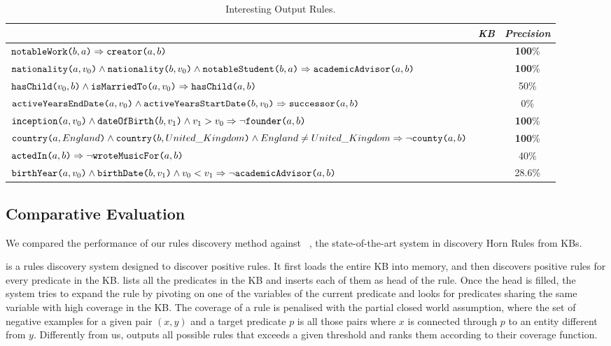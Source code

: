 \begin{table}[htb]
	\centering
	\label{tab:krd_rules_example}
	\begin{small}
		\begin{tabular}{>{\centering}m{10cm}|c|c}
			{\it Rule}&{\it KB}&{\it Precision} \tabularnewline
			\hline
			$\texttt{notableWork(}b,a\texttt{)} \Rightarrow \texttt{creator(}a,b\texttt{)}$ & \wikidata & \textbf{100}\% \tabularnewline
			$\texttt{nationality(}a,v_0\texttt{)} \wedge \texttt{nationality(}b,v_0\texttt{)} \wedge \texttt{notableStudent(}b,a\texttt{)} \Rightarrow \texttt{academicAdvisor(}a,b\texttt{)} $ & \dbpedia & \textbf{100}\% \tabularnewline
			$\texttt{hasChild(}v_0,b\texttt{)} \wedge \texttt{isMarriedTo(}a,v_0\texttt{)} \Rightarrow \texttt{hasChild(}a,b\texttt{)}$ & \yago & 50\% \tabularnewline
			$\texttt{activeYearsEndDate(}a,v_0\texttt{)} \wedge \texttt{activeYearsStartDate(}b,v_0\texttt{)} \Rightarrow \texttt{successor(}a,b\texttt{)}$ & \dbpedia & 0\% 
			\tabularnewline 
			$\texttt{inception(}a,v_0\texttt{)} \wedge \texttt{dateOfBirth(}b,v_1\texttt{)} \wedge v_1 > v_0 \Rightarrow \neg \texttt{founder(}a,b\texttt{)} $  & \wikidata & \textbf{100}\% 
			\tabularnewline 
			$\texttt{country(}a,England\texttt{)} \wedge \texttt{country(}b,United\_Kingdom\texttt{)} \wedge England \neq United\_Kingdom \Rightarrow \neg \texttt{county(}a,b\texttt{)}$ & \dbpedia & \textbf{100}\% \tabularnewline
			$\texttt{actedIn(}a,b\texttt{)} \Rightarrow \neg \texttt{wroteMusicFor(}a,b\texttt{)}$ & \yago & 40\% \tabularnewline
			$\texttt{birthYear(}a,v_0\texttt{)} \wedge \texttt{birthDate(}b,v_1\texttt{)} \wedge v_0 < v_1 \Rightarrow \neg \texttt{academicAdvisor(}a,b\texttt{)} $  & \dbpedia & 28.6\% 
		\end{tabular}
	\end{small}
	\caption{Interesting Output Rules.}
\end{table}



\subsection{Comparative Evaluation} \label{sec:krd_comparative}
We compared the performance of our rules discovery method against \amie~\cite{galarraga2015fast}, the state-of-the-art system in discovery Horn Rules from KBs.

\amie is a rules discovery system designed to discover positive rules. It first loads the entire KB into memory, and then discovers positive rules for every predicate in the KB. \amie lists all the predicates in the KB and inserts each of them as head of the rule. Once the head is filled, the system tries to expand the rule by pivoting on one of the variables of the current predicate and looks for predicates sharing the same variable with high coverage in the KB. The coverage of  a rule is penalised with the partial closed world assumption, where the set of negative examples for a given pair $(x,y)$ and a target predicate $p$ is all those pairs where $x$ is connected through $p$ to an entity different from $y$. Differently from us, \amie outputs all possible rules that exceeds a given threshold and ranks them according to their coverage function.

